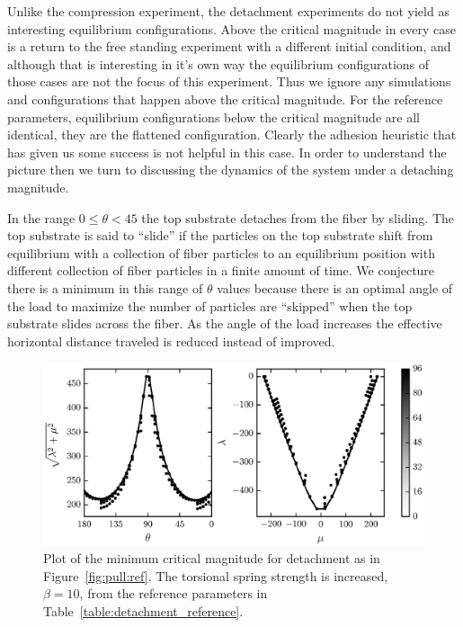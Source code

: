 Unlike the compression experiment, the detachment experiments do not yield as interesting equilibrium configurations. Above the critical magnitude in every case is a return to the free standing experiment with a different initial condition, and although that is interesting in it's own way the equilibrium configurations of those cases are not the focus of this experiment. Thus we ignore any simulations and configurations that happen above the critical magnitude. For the reference parameters, equilibrium configurations below the critical magnitude are all identical, they are the flattened configuration. Clearly the adhesion heuristic that has given us some success is not helpful in this case. In order to understand the picture then we turn to discussing the dynamics of the system under a detaching magnitude.

In the range $0 \leq \theta < 45$ the top substrate detaches from the fiber by sliding. The top substrate is said to ``slide'' if the particles on the top substrate shift from equilibrium with a collection of fiber particles to an equilibrium position with different collection of fiber particles in a finite amount of time. We conjecture there is a minimum in this range of $\theta$ values because there is an optimal angle of the load to maximize the number of particles are ``skipped'' when the top substrate slides across the fiber. As the angle of the load increases the effective horizontal distance traveled is reduced instead of improved.

	\begin{figure}[t]
		\begin{center}
			\includegraphics{./fig/ch3/pull/b10/grid.eps}
		\end{center}		
		\caption{Plot of the minimum critical magnitude for detachment as in Figure~\ref{fig:pull:ref}. The torsional spring strength is increased, $\beta=10$, from the reference parameters in Table~\ref{table:detachment_reference}.
		\label{fig:pull:b10}}
	\end{figure}

